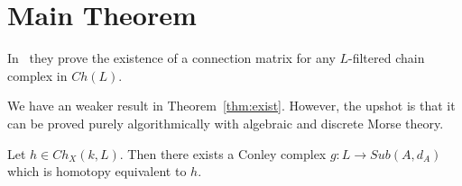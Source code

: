 
\section{Main Theorem}\label{sec:thm}

In~\cite{salamon} they prove the existence of a connection matrix for any $L$-filtered chain complex in $Ch(L)$.

We have an weaker result in Theorem~\ref{thm:exist}.  However,  the upshot is that it can be proved purely algorithmically with algebraic and discrete Morse theory.  


\begin{thm}\label{thm:exist}
Let $h\in Ch_X(k,L)$.  Then there exists a Conley complex $g:L\to Sub(A,d_A)$ which is homotopy equivalent to $h$.
\end{thm}
%









